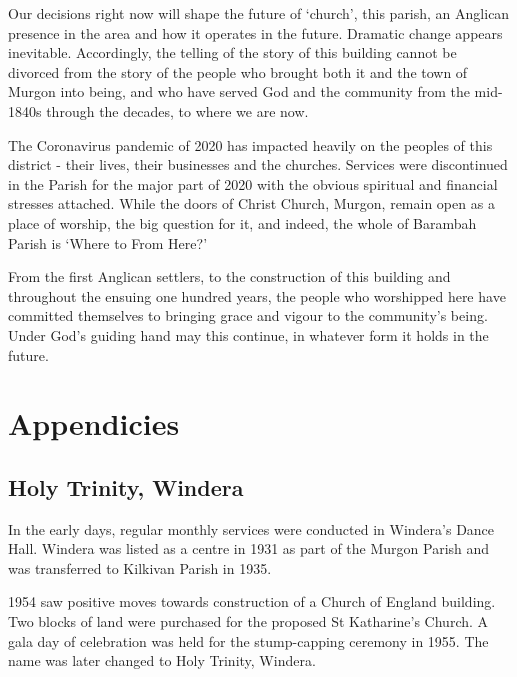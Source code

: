 Our decisions right now will shape the future of `church', this parish, an Anglican presence in the area and how it operates in the future. Dramatic change appears inevitable. Accordingly, the telling of the story of this building cannot be divorced from the story of the people who brought both it and the town of Murgon into being, and who have served God and the community from the mid-1840s through the decades, to where we are now.



The Coronavirus pandemic of 2020 has impacted heavily on the peoples of this district - their lives, their businesses and the churches. Services were discontinued in the Parish for the major part of 2020 with the obvious spiritual and financial stresses attached. While the doors of Christ Church, Murgon, remain open as a place of worship, the big question for it, and indeed, the whole of Barambah Parish is `Where to From Here?'



From the first Anglican settlers, to the construction of this building and throughout the ensuing one hundred years, the people who worshipped here have committed themselves to bringing grace and vigour to the community's being. Under God's guiding hand may this continue, in whatever form it holds in the future.

\balance


\backmatter
\chapter{Appendicies}
\nobalance


\section{Holy Trinity, Windera}



In the early days, regular monthly services were conducted in Windera's Dance Hall. Windera was listed as a centre in 1931 as part of the Murgon Parish and was transferred to Kilkivan Parish in 1935.



1954 saw positive moves towards construction of a Church of England building. Two blocks of land were purchased for the proposed St Katharine's Church. A gala day of celebration was held for the stump-capping ceremony in 1955. The name was later changed to Holy Trinity, Windera.



